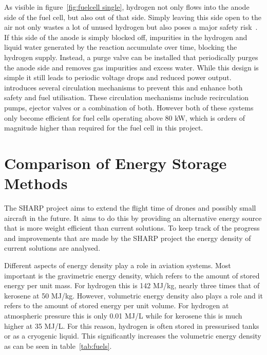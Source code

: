 As visible in figure~\ref{fig:fuelcell single}, hydrogen not only flows into the anode side of the fuel cell, but also out of that side. Simply leaving this side open to the air not only wastes a lot of unused hydrogen but also poses a major safety risk~\cite{Li:circulation}. If this side of the anode is simply blocked off, impurities in the hydrogen and liquid water generated by the reaction accumulate over time, blocking the hydrogen supply. Instead, a purge valve can be installed that periodically purges the anode side and removes gas impurities and excess water. While this design is simple it still leads to periodic voltage drops and reduced power output.
\citeauthor{Li:circulation} introduces several circulation mechanisms to prevent this and enhance both safety and fuel utilisation. These circulation mechanisms include recirculation pumps, ejector valves or a combination of both. However both of these systems only become efficient for fuel cells operating above 80 kW, which is orders of magnitude higher than required for the fuel cell in this project.

\section{Comparison of Energy Storage Methods}
The SHARP project aims to extend the flight time of drones and possibly small aircraft in the future. It aims to do this by providing an alternative energy source that is more weight efficient than current solutions. To keep track of the progress and improvements that are made by the SHARP project the energy density of current solutions are analysed.

Different aspects of energy density play a role in aviation systems. Most important is the gravimetric energy density, which refers to the amount of stored energy per unit mass. For hydrogen this is 142 MJ/kg, nearly three times that of kerosene at 50 MJ/kg. However, volumetric energy density also plays a role and it refers to the amount of stored energy per unit volume. For hydrogen at atmospheric pressure this is only 0.01 MJ/L while for kerosene this is much higher at 35 MJ/L. For this reason, hydrogen is often stored in pressurised tanks or as a cryogenic liquid. This significantly increases the volumetric energy density as can be seen in table~\ref{tab:fuels}.

